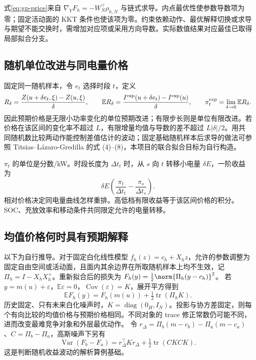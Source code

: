 式\eqref{eq:gp-price}来自 $\nabla_YF_h=-W_N^\top\rho_{h,N}$ 与链式求导。内点最优性使参数导数项为零；固定活动面的 KKT 条件也使该项为零。约束依赖动作、最优解释切换或求导与期望不能交换时，需增加对应项或采用方向导数。实际数值结果对应最佳已取得局部拟合分支。

\subsection{随机单位改进与同电量价格}
固定同一随机样本，令 $e_t$ 选择时段 $t$，定义
\begin{equation}
R_\delta=\frac{Z(u+\delta e_t,\xi)-Z(u,\xi)}{\delta},\qquad
\mathbb E R_\delta=\frac{I^{\rm exp}(u+\delta e_t)-I^{\rm exp}(u)}{\delta},\qquad
\pi_t^{\rm exp}=\lim_{\delta\to0}\mathbb E R_\delta.
\label{eq:gp-unit}
\end{equation}
因此预期价格是无限小功率变化的单位预期改进；有限步长则是单位有限改进。若价格在该区间的变化率不超过 $L$，有限增量均值与导数的差不超过 $L|\delta|/2$。用共同随机数比较两动作能控制差值估计的波动；固定基础随机样本后求导的做法可参照 Titsias--L\'azaro-Gredilla 的式 (4)--(8)\cite{gp-titsias}，本项目的联合拟合目标为自行构造。

$\pi_t$ 的单位是分数/kW。时段长度为 $\Delta t_t$ 时，从 $s$ 向 $t$ 转移小电量 $\delta E$，一阶收益为
\begin{equation}
\delta E\left(\frac{\pi_t}{\Delta t_t}-\frac{\pi_s}{\Delta t_s}\right).
\label{eq:gp-energy-price}
\end{equation}
相对价格决定同电量曲线怎样重排。高低档有限收益等于该区间价格的积分。SOC、充放效率和移动条件共同限定允许的电量转移。

\subsection{均值价格何时具有预期解释}
以下为自行推导。对于固定白化线性模型 $f_h(z)=c_h+X_hz$，允许的参数调整为固定自由空间或活动面，且面内其余边界在所取随机样本上均不生效，记
$\Pi_h=I-X_hX_h^+$。重新拟合后的损失为
$F_h(y)=\tfrac12\norm{\Pi_h(y-c_h)}^2$。
若 $y=m(u)+\varepsilon$，$\mathbb E\varepsilon=0$，$\operatorname{Cov}(\varepsilon)=K$，展开平方得到
\begin{equation}
\mathbb EF_h(y)=F_h(m(u))+\tfrac12\operatorname{tr}(\Pi_hK).
\label{eq:gp-trace}
\end{equation}
历史固定、只有未来白化噪声时，$K=\operatorname{diag}(0_H,I_N)$。投影与协方差固定，则每个有向比较的均值价格与预期价格相同。不同对象的 trace 修正常数仍可能不同，进而改变最难竞争对象和外层最优动作。
令 $r_\Delta=\Pi_b(m-c_b)-\Pi_a(m-c_a)$、$C=\Pi_b-\Pi_a$，高斯噪声下另有
\begin{equation}
\operatorname{Var}(F_b-F_a)=r_\Delta^\top Kr_\Delta+\tfrac12\operatorname{tr}(CKCK).
\label{eq:gp-variance}
\end{equation}
这是判断随机收益波动的解析算例基础。

